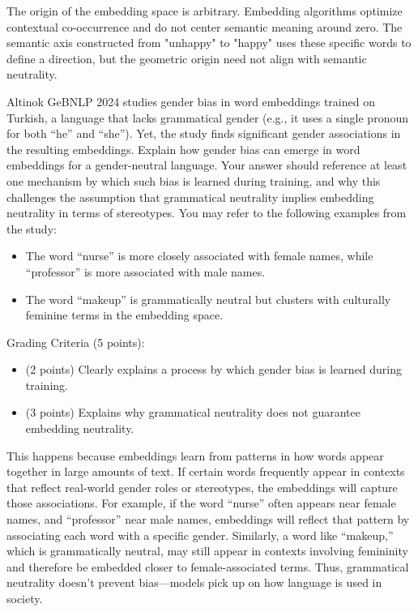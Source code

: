 \documentclass[11pt,addpoints,answers]{exam}
\begin{document}
\begin{questions}
\begin{solution}
The origin of the embedding space is arbitrary. Embedding algorithms optimize contextual co-occurrence and do not center semantic meaning around zero. The semantic axis constructed from "unhappy" to "happy" uses these specific words to define a direction, but the geometric origin need not align with semantic neutrality.
\end{solution}

\question[5] Altinok GeBNLP 2024 studies gender bias in word embeddings trained on Turkish, a language that lacks grammatical gender (e.g., it uses a single pronoun for both ``he'' and ``she''). Yet, the study finds significant gender associations in the resulting embeddings. Explain how gender bias can emerge in word embeddings for a gender-neutral language. Your answer should reference at least one mechanism by which such bias is learned during training, and why this challenges the assumption that grammatical neutrality implies embedding neutrality in terms of stereotypes. You may refer to the following examples from the study:
\begin{itemize}
    \item The word ``nurse'' is more closely associated with female names, while ``professor'' is more associated with male names.
    \item The word ``makeup'' is grammatically neutral but clusters with culturally feminine terms in the embedding space.
\end{itemize}

Grading Criteria (5 points):
\begin{itemize}
  \item (2 points) Clearly explains a process by which gender bias is learned during training.
  \item (3 points) Explains why grammatical neutrality does not guarantee embedding neutrality.
\end{itemize}

\begin{solution}
This happens because embeddings learn from patterns in how words appear together in large amounts of text. If certain words frequently appear in contexts that reflect real-world gender roles or stereotypes, the embeddings will capture those associations.
For example, if the word ``nurse'' often appears near female names, and ``professor'' near male names, embeddings will reflect that pattern by associating each word with a specific gender. Similarly, a word like ``makeup,'' which is grammatically neutral, may still appear in contexts involving femininity and therefore be embedded closer to female-associated terms.
Thus, grammatical neutrality doesn't prevent bias—models pick up on how language is used in society.
\end{solution}


\end{questions}
\end{document}
